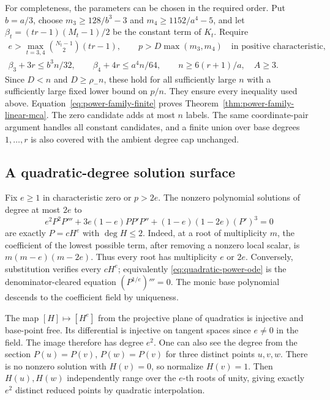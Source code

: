 For completeness, the parameters can be chosen in the required order.
Put $b=a/3$, choose $m_3\ge128/b^3-3$ and $m_4\ge1152/a^4-5$,
and let $\beta_t=(tr-1)(M_t-1)/2$ be the constant term of $K_t$.
Require
\begin{gather*}
 e>\max_{t=3,4}\binom{N_t-1}{2}(tr-1),\qquad
 p>D\max(m_3,m_4)\quad\text{in positive characteristic},\\
 \beta_3+3r\le b^3n/32,\qquad
 \beta_4+4r\le a^4n/64,\qquad n\ge6(r+1)/a,\quad A\ge3.
\end{gather*}
Since $D<n$ and $D\ge\rho_-n$, these hold for all sufficiently large
$n$ with a sufficiently large fixed lower bound on $p/n$. They ensure
every inequality used above. Equation~\eqref{eq:power-family-finite}
proves Theorem~\ref{thm:power-family-linear-mca}.
The zero candidate adds at most $n$ labels. The same coordinate-pair
argument handles all constant candidates, and a finite union over base
degrees $1,\ldots,r$ is also covered with the ambient degree cap unchanged.

\subsection{A quadratic-degree solution surface}

Fix $e\ge1$ in characteristic zero or $p>2e$. The nonzero polynomial
solutions of degree at most $2e$ to
\begin{equation}\label{eq:quadratic-power-ode}
 e^2P^2P'''+3e(1-e)PP'P''+(1-e)(1-2e)(P')^3=0
\end{equation}
are exactly $P=cH^e$ with $\deg H\le2$. Indeed, at a root of
multiplicity $m$, the coefficient of the lowest possible term, after
removing a nonzero local scalar, is $m(m-e)(m-2e)$. Thus every root
has multiplicity $e$ or $2e$. Conversely, substitution verifies every
$cH^e$; equivalently \eqref{eq:quadratic-power-ode} is the
denominator-cleared equation $(P^{1/e})'''=0$.
The monic base polynomial descends to the coefficient field by uniqueness.

The map $[H]\mapsto[H^e]$ from the projective plane of quadratics is
injective and base-point free. Its differential is injective on tangent
spaces since $e\ne0$ in the field. The image therefore has degree $e^2$.
One can also see the degree from the section
$P(u)=P(v)$, $P(w)=P(v)$ for three distinct points $u,v,w$.
There is no nonzero solution with $H(v)=0$, so normalize $H(v)=1$.
Then $H(u),H(w)$ independently range over the $e$-th roots of unity,
giving exactly $e^2$ distinct reduced points by quadratic interpolation.

